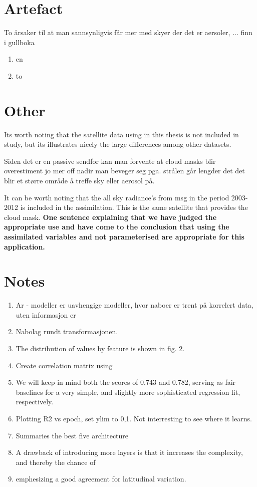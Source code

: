 \section{Artefact}
To årsaker til at man sannsynligvis får mer med skyer der det er aersoler,  ... finn i gullboka
\begin{enumerate}
    \item en
    \item to
\end{enumerate}


\section{Other}
Its worth noting that the satellite data using in this thesis is not included in  \citeauthor{Stubenrauch2013AssessmentPanel} study, but its illustrates nicely the large differences among other datasets. 


Siden det er en passive sendfor kan man forvente at cloud masks blir overestiment jo mer off nadir man beveger seg pga. strålen går lengder det det blir et større område å treffe sky eller aerosol på. \citeauthor{Maddux2010ViewingProducts}


It can be worth noting that the all sky radiance's from \acrfull{msg} in the period 2003-2012 is included in the assimilation. This is the same satellite that provides the cloud mask. 
\textbf{One sentence explaining that we have judged the appropriate use and have come to the conclusion that using the assimilated variables and not parameterised are appropriate for this application.}

\section{Notes}
\begin{enumerate}
    \item Ar - modeller er uavhengige modeller, hvor naboer er trent på korrelert data, uten informasjon er
    \item Nabolag rundt transformasjonen. 
    \item The distribution of values
    by feature is shown in fig. 2.
    \item Create correlation matrix using 
    \item We will keep in mind both the scores of 0.743 and 0.782, serving
    as fair baselines for a very simple, and slightly more sophisticated
    regression fit, respectively.
    \item Plotting R2 vs epoch, set ylim to 0,1. Not interresting to see where it learns.
    \item Summaries the best five architecture 
    \item A drawback of introducing more layers
    is that it increases the complexity, and thereby the chance of
    \item emphesizing a good agreement for latitudinal variation.
\end{enumerate}

